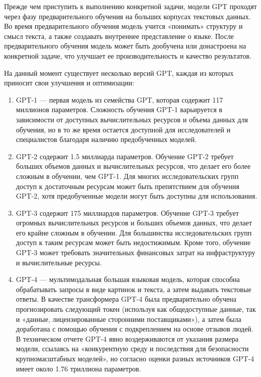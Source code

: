 \documentclass[a4paper,12pt]{extarticle}
\begin{document}
Прежде чем приступить к выполнению конкретной задачи, модели GPT проходят через фазу предварительного обучения на больших корпусах текстовых данных. Во время предварительного обучения модель учится «понимать» структуру и смысл текста, а также создавать внутреннее представление о языке. После предварительного обучения модель может быть дообучена или донастроена на конкретной задаче, что улучшает ее производительность и качество результатов.


На данный момент существует несколько версий GPT, каждая из которых приносит свои улучшения и оптимизации:
\begin{enumerate}[label=\arabic*.]
	\item GPT-1 — первая модель из семейства GPT, которая содержит 117 миллионов параметров. Сложность обучения GPT-1 варьируется в зависимости от доступных вычислительных ресурсов и объема данных для обучения, но в то же время остается доступной для исследователей и специалистов благодаря наличию предобученных моделей. 
	\item GPT-2 содержит 1.5 миллиарда параметров. Обучение GPT-2 требует больших объемов данных и вычислительных ресурсов, что делает его более сложным в обучении, чем GPT-1. Для многих исследовательских групп доступ к достаточным ресурсам может быть препятствием для обучения GPT-2, хотя предобученные модели могут быть доступны для использования.
	\item GPT-3 содержит 175 миллиардов параметров. Обучение GPT-3 требует огромных вычислительных ресурсов и больших объемов данных, что делает его крайне сложным в обучении. Для большинства исследовательских групп доступ к таким ресурсам может быть недостижимым. Кроме того, обучение GPT-3 может требовать значительных финансовых затрат на инфраструктуру и вычислительные ресурсы.
	\item GPT-4 — мультимодальная большая языковая модель, которая способна обрабатывать запросы в виде картинок и текста, а затем выдавать текстовые ответы. В качестве трансформера GPT-4 была предварительно обучена прогнозировать следующий токен (используя как общедоступные данные, так и «данные, лицензированные сторонними поставщиками»), а затем была доработана с помощью обучения с подкреплением на основе отзывов людей. В техническом отчете GPT-4 явно воздерживаются от указания размера модели, ссылаясь на «конкурентную среду и последствия для безопасности крупномасштабных моделей», но согласно оценки разных источников GPT-4 имеет около 1.76 триллиона параметров.
\end{enumerate}
\end{document}

